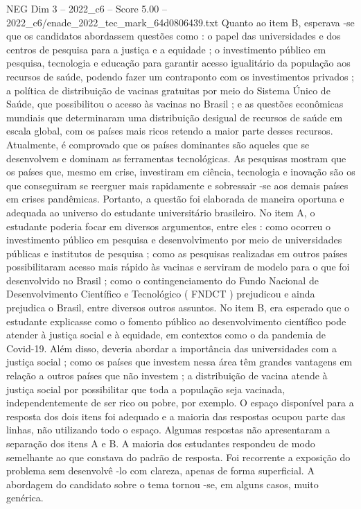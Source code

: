 \begin{textsample}{NEG Dim 3 – 2022\_c6 – Score 5.00 – 2022\_c6/enade\_2022\_tec\_mark\_64d0806439.txt}
Quanto ao item B, esperava -se que os candidatos abordassem questões como : o papel das universidades e dos centros de pesquisa para a justiça e a equidade ; o investimento público em pesquisa, tecnologia e educação para garantir acesso igualitário da população aos recursos de saúde, podendo fazer um contraponto com os investimentos privados ; a política de distribuição de vacinas gratuitas por meio do Sistema Único de Saúde, que possibilitou o acesso às vacinas no Brasil ; e as questões econômicas mundiais que determinaram uma distribuição desigual de recursos de saúde em escala global, com os países mais ricos retendo a maior parte desses recursos.
Atualmente, é comprovado que os países dominantes são aqueles que se desenvolvem e dominam as ferramentas tecnológicas.
As pesquisas mostram que os países que, mesmo em crise, investiram em ciência, tecnologia e inovação são os que conseguiram se reerguer mais rapidamente e sobressair -se aos demais países em crises pandêmicas.
Portanto, a questão foi elaborada de maneira oportuna e adequada ao universo do estudante universitário brasileiro.
No item A, o estudante poderia focar em diversos argumentos, entre eles : como ocorreu o investimento público em pesquisa e desenvolvimento por meio de universidades públicas e institutos de pesquisa ; como as pesquisas realizadas em outros países possibilitaram acesso mais rápido às vacinas e serviram de modelo para o que foi desenvolvido no Brasil ; como o contingenciamento do Fundo Nacional de Desenvolvimento Científico e Tecnológico ( FNDCT ) prejudicou e ainda prejudica o Brasil, entre diversos outros assuntos.
No item B, era esperado que o estudante explicasse como o fomento público ao desenvolvimento científico pode atender à justiça social e à equidade, em contextos como o da pandemia de Covid-19.
Além disso, deveria abordar a importância das universidades com a justiça social ; como os países que investem nessa área têm grandes vantagens em relação a outros países que não investem ; a distribuição de vacina atende à justiça social por possibilitar que toda a população seja vacinada, independentemente de ser rico ou pobre, por exemplo.
O espaço disponível para a resposta dos dois itens foi adequado e a maioria das respostas ocupou parte das linhas, não utilizando todo o espaço.
Algumas respostas não apresentaram a separação dos itens A e B.
A maioria dos estudantes respondeu de modo semelhante ao que constava do padrão de resposta.
Foi recorrente a exposição do problema sem desenvolvê -lo com clareza, apenas de forma superficial.
A abordagem do candidato sobre o tema tornou -se, em alguns casos, muito genérica.

\end{textsample}
